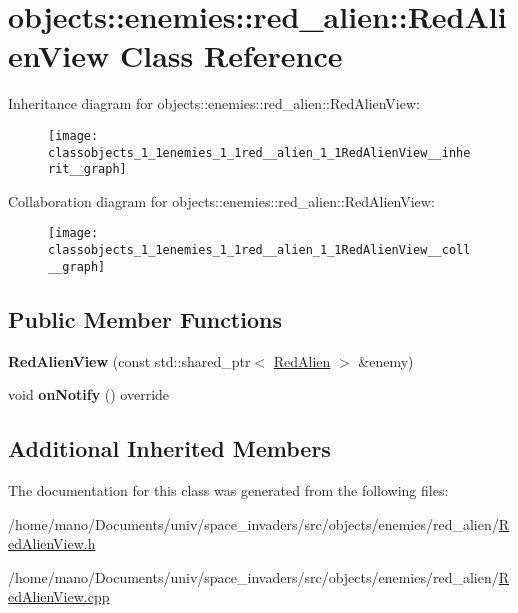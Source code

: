 \hypertarget{classobjects_1_1enemies_1_1red__alien_1_1RedAlienView}{}\section{objects\+:\+:enemies\+:\+:red\+\_\+alien\+:\+:Red\+Alien\+View Class Reference}
\label{classobjects_1_1enemies_1_1red__alien_1_1RedAlienView}


Inheritance diagram for objects\+:\+:enemies\+:\+:red\+\_\+alien\+:\+:Red\+Alien\+View\+:\nopagebreak
\begin{figure}[H]
\begin{center}
\leavevmode
\texttt{[image: classobjects\_1\_1enemies\_1\_1red\_\_alien\_1\_1RedAlienView\_\_inherit\_\_graph]}
\end{center}
\end{figure}


Collaboration diagram for objects\+:\+:enemies\+:\+:red\+\_\+alien\+:\+:Red\+Alien\+View\+:\nopagebreak
\begin{figure}[H]
\begin{center}
\leavevmode
\texttt{[image: classobjects\_1\_1enemies\_1\_1red\_\_alien\_1\_1RedAlienView\_\_coll\_\_graph]}
\end{center}
\end{figure}
\subsection*{Public Member Functions}
\begin{DoxyCompactItemize}
\item 
\mbox{\label{classobjects_1_1enemies_1_1red__alien_1_1RedAlienView_a291f78b84b87557b59bcf98d2cef95a6}}
{\bfseries Red\+Alien\+View} (const std\+::shared\+\_\+ptr$<$ \hyperlink{classobjects_1_1enemies_1_1red__alien_1_1RedAlien}{Red\+Alien} $>$ \&enemy)
\item 
\mbox{\label{classobjects_1_1enemies_1_1red__alien_1_1RedAlienView_abddf987c883563442aa29a5bebfdfe9b}}
void {\bfseries on\+Notify} () override
\end{DoxyCompactItemize}
\subsection*{Additional Inherited Members}


The documentation for this class was generated from the following files\+:\begin{DoxyCompactItemize}
\item 
/home/mano/\+Documents/univ/space\+\_\+invaders/src/objects/enemies/red\+\_\+alien/\hyperlink{RedAlienView_8h}{Red\+Alien\+View.\+h}\item
/home/mano/\+Documents/univ/space\+\_\+invaders/src/objects/enemies/red\+\_\+alien/\hyperlink{RedAlienView_8cpp}{Red\+Alien\+View.\+cpp}\end{DoxyCompactItemize}
